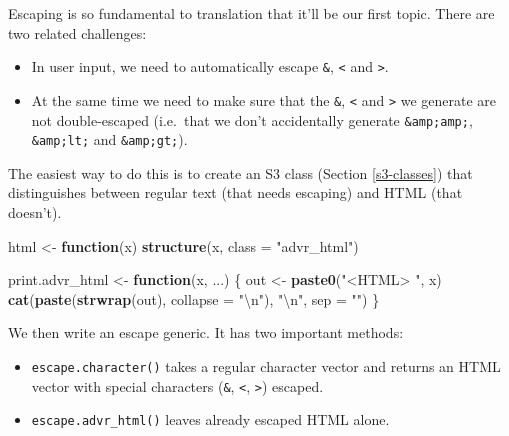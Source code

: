 \documentclass[]{book}
\newenvironment{Shaded}{\begin{snugshade}}{\end{snugshade}}
\newcommand{\CharTok}[1]{\textcolor[rgb]{0.5,0.5,0.5}{#1}}
\newcommand{\ControlFlowTok}[1]{\textcolor[rgb]{0.27,0.27,0.27}{\textbf{#1}}}
\newcommand{\DataTypeTok}[1]{\textcolor[rgb]{0.27,0.27,0.27}{#1}}
\newcommand{\KeywordTok}[1]{\textcolor[rgb]{0.27,0.27,0.27}{\textbf{#1}}}
\newcommand{\NormalTok}[1]{#1}
\newcommand{\StringTok}[1]{\textcolor[rgb]{0.5,0.5,0.5}{#1}}
\begin{document}

Escaping is so fundamental to translation that it'll be our first topic. There are two related challenges:

\begin{itemize}
\item
  In user input, we need to automatically escape \texttt{\&}, \texttt{\textless{}} and \texttt{\textgreater{}}.
\item
  At the same time we need to make sure that the \texttt{\&}, \texttt{\textless{}} and \texttt{\textgreater{}} we generate
  are not double-escaped (i.e.~that we don't accidentally generate \texttt{\&amp;amp;}, \texttt{\&amp;lt;} and \texttt{\&amp;gt;}).
\end{itemize}

The easiest way to do this is to create an S3 class (Section \ref{s3-classes}) that distinguishes between regular text (that needs escaping) and HTML (that doesn't).

\begin{Shaded}
\begin{Highlighting}[]
\NormalTok{html <-}\StringTok{ }\ControlFlowTok{function}\NormalTok{(x) }\KeywordTok{structure}\NormalTok{(x, }\DataTypeTok{class =} \StringTok{"advr_html"}\NormalTok{)}

\NormalTok{print.advr_html <-}\StringTok{ }\ControlFlowTok{function}\NormalTok{(x, ...) \{}
\NormalTok{  out <-}\StringTok{ }\KeywordTok{paste0}\NormalTok{(}\StringTok{"<HTML> "}\NormalTok{, x)}
  \KeywordTok{cat}\NormalTok{(}\KeywordTok{paste}\NormalTok{(}\KeywordTok{strwrap}\NormalTok{(out), }\DataTypeTok{collapse =} \StringTok{"}\CharTok{\textbackslash{}n}\StringTok{"}\NormalTok{), }\StringTok{"}\CharTok{\textbackslash{}n}\StringTok{"}\NormalTok{, }\DataTypeTok{sep =} \StringTok{""}\NormalTok{)}
\NormalTok{\}}
\end{Highlighting}
\end{Shaded}

We then write an escape generic. It has two important methods:

\begin{itemize}
\item
  \texttt{escape.character()} takes a regular character vector and returns an HTML
  vector with special characters (\texttt{\&}, \texttt{\textless{}}, \texttt{\textgreater{}}) escaped.
\item
  \texttt{escape.advr\_html()} leaves already escaped HTML alone.
\end{itemize}
\end{document}
